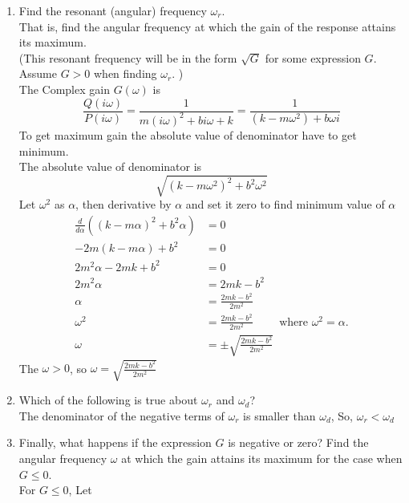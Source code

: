 \begin{enumerate}
\item Find the resonant (angular) frequency $\omega_ r$.\\
  That is, find the angular frequency at which the gain of the response attains its maximum. \\
  (This resonant frequency will be in the form $\sqrt{G}$
  for some expression $G$. Assume $G>0$ when finding $\omega _r$. )\\
  The Complex gain $G(\omega)$ is
  \begin{equation*}
    \frac{Q(i \omega)}{P(i \omega)}
    = \frac{1}{m (i \omega)^2 + b i \omega + k}
    = \frac{1}{(k - m \omega ^2) + b \omega i}
  \end{equation*}
  To get maximum gain the absolute value of denominator have to get minimum. \\
  The absolute value of denominator is
  \begin{equation*}
    \sqrt{(k - m \omega ^2)^2 + b^2 \omega^2}
  \end{equation*}
  Let $\omega ^2$ as $\alpha$, then derivative by $\alpha$ and set it zero to find minimum value of $\alpha$
  \begin{align*}
    \frac{d}{d \alpha} \left( (k - m \alpha)^2 + b^2 \alpha \right) &= 0 \\
    -2m(k - m \alpha) + b^2 &= 0 \\
    2m^2 \alpha - 2mk + b^2 &= 0 \\
    2m^2 \alpha &= 2mk - b^2\\
    \alpha &= \frac{2mk - b^2}{2m^2} \\
    \omega ^2 &= \frac{2mk - b^2}{2m^2} \qquad \text{ where } \omega ^2 = \alpha. \\
    \omega &= \pm \sqrt{\frac{2mk - b^2}{2m^2}}
  \end{align*}
  The $\omega > 0$, so $\omega = \sqrt{\frac{2mk - b^2}{2m^2}}$

\item Which of the following is true about $\omega_ r$ and $\omega_ d$?\\

  The denominator of the negative terms of $\omega _r$ is smaller than $\omega _d$,
  So, $\omega _ r < \omega _ d$

\item Finally, what happens if the expression $G$ is negative or zero?
  Find the angular frequency $\omega$ at which the gain attains
  its maximum for the case when $G≤0$.\\

  For $G≤0$,
  Let 

\end{enumerate}
\clearpage

